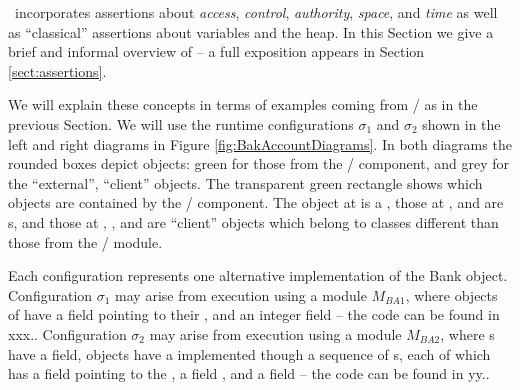 

%
%
\Chainmail\ incorporates assertions   about
%
\textit{access},
%
\textit{control},
%
\textit{authority},
%
\textit{space}, %
%
and
%
\textit{time}
%
as well as   ``classical'' assertions 
about  variables and the heap.
%
In this Section we  give a brief and informal  overview of %
\Chainmail -- a full exposition appears in Section \ref{sect:assertions}.



 We  will explain these concepts in terms of examples coming from  / as  in the previous Section.
We will use the runtime configurations $\sigma_1$ and $\sigma_2$ 
shown in the left and right diagrams in Figure \ref{fig:BakAccountDiagrams}.
In both diagrams the rounded boxes depict objects:  green for those from the 
/ component, and grey for the ``external'',  ``client'' objects.
The transparent green rectangle  shows which objects are contained by the / component.
The object at  is a , those at ,  and  are 
s, and those at , ,  and  are 
``client'' objects which belong to classes different than those from the /  module.

Each configuration represents one alternative implementation of the Bank object.
Configuration  $\sigma_1$ may arise from execution using a module $M_{BA1}$, where   objects of
  have a field  pointing to their , and an integer field  
-- the code can be found in xxx.. 
Configuration  $\sigma_2$ may arise from execution using a module $M_{BA2}$,  where s have a 
field,   objects  have a  implemented though a sequence of s, each of which has a 
 field pointing to the , a field , and a field   -- the code can be found in yy..

